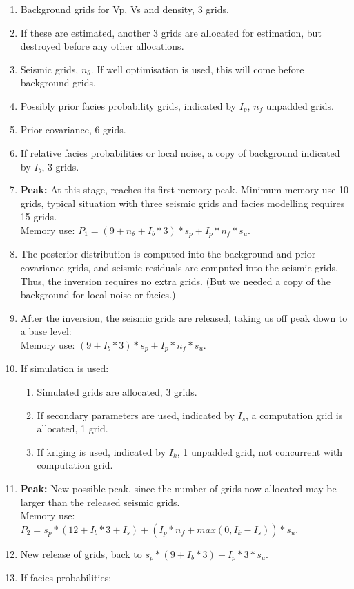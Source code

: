 \begin{enumerate}
\item Background grids for Vp, Vs and density, 3 grids.
\item If these are estimated, another 3 grids are allocated for estimation, but destroyed before any other allocations.
\item Seismic grids, $n_\theta$. If well optimisation is used, this will come before background grids.
\item Possibly prior facies probability grids, indicated by $I_p$, $n_f$ unpadded grids.
\item Prior covariance, 6 grids.
\item If relative facies probabilities or local noise, a copy of background indicated by $I_b$, 3 grids.
\item {\bf Peak:} At this stage, \crava reaches its first memory peak. Minimum memory use 10 grids, typical situation with three seismic grids and facies modelling requires 15 grids. \\ 
    Memory use: $P_1 = (9+n_\theta+I_b*3)*s_p+I_p*n_f*s_u$.
\item The posterior distribution is computed into the background and prior covariance grids, and seismic residuals are computed into the seismic grids. Thus, the inversion requires no extra grids. (But we needed a copy of the background for local noise or facies.)
\item After the inversion, the seismic grids are released, taking us off peak down to a base level: \\ Memory use: $(9+I_b*3)*s_p+I_p*n_f*s_u$.
\item If simulation is used:
\begin{enumerate}
\item Simulated grids are allocated, 3 grids.
\item If secondary parameters are used, indicated by $I_s$, a computation grid is allocated, 1 grid.
\item If kriging is used, indicated by $I_k$, 1 unpadded grid, not concurrent with computation grid. 
\end{enumerate}
\item {\bf Peak:} New possible peak, since the number of grids now allocated may be larger than the released seismic grids. \\
    Memory use: $P_2 = s_p*(12+I_b*3+I_s)+(I_p*n_f + max(0,I_k-I_s))*s_u$.
\item New release of grids, back to $s_p*(9+I_b*3)+I_p*3*s_u$.
\item If facies probabilities:

\end{enumerate}
